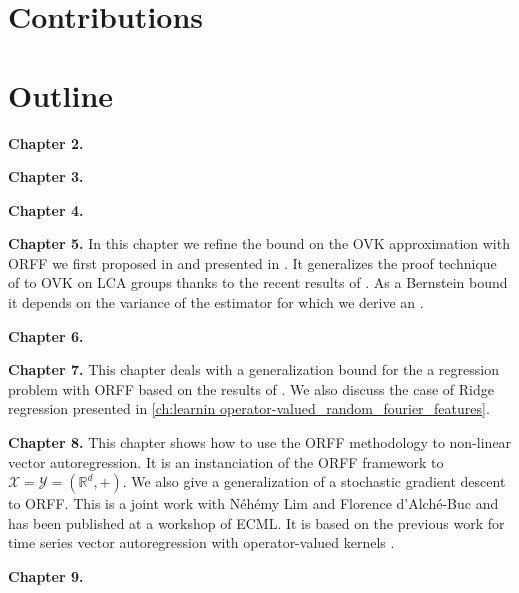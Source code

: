 \section{Contributions}

\section{Outline}

\textbf{Chapter 2.}

\textbf{Chapter 3.}

\textbf{Chapter 4.}

\textbf{Chapter 5.} 
In this chapter we refine the bound on the \ac{OVK} approximation with
\ac{ORFF} we first proposed in \cite{brault2016random} and presented in
\cite{braultborne}. It generalizes the proof technique of \citet{Rahimi2007} to
\ac{OVK} on \ac{LCA} groups thanks to the recent results of
\citet{sutherland2015, tropp2015introduction, minsker2011some,
koltchinskii2013remark}. As a Bernstein bound it depends on the variance of the
estimator for which we derive an .

\textbf{Chapter 6.}

\textbf{Chapter 7.}
This chapter deals with a generalization bound for the a regression problem
with ORFF based on the results of \citet{rahimi2009weighted, maurer2016vector}.
We also discuss the case of Ridge regression presented in \cref{ch:learnin
operator-valued_random_fourier_features}.

\textbf{Chapter 8.}
This chapter shows how to use the \acs{ORFF} methodology to non-linear vector
autoregression. It is an instanciation of the \acs{ORFF} framework to
$\mathcal{X}=\mathcal{Y}=(\mathbb{R}^d, +)$. We also give a generalization of a
stochastic gradient descent \citep{dai2014scalable} to \acs{ORFF}. This is a
joint work with N\'eh\'emy Lim and Florence d'Alch\'e-Buc and has been
published at a workshop of \acs{ECML}. It is based on the previous work
\citet{Lim2015} for time series vector autoregression with operator-valued
kernels \cite{brault2016scaling}.

\textbf{Chapter 9.}


